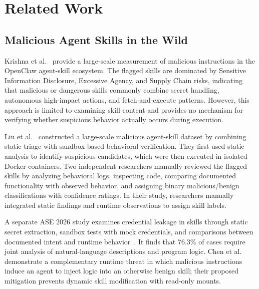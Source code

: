 \section{Related Work}
\label{sec:related-work}



\subsection{Malicious Agent Skills in the Wild}
Krishna et al.~\cite{krishna2026clawdpwned} provide a large-scale measurement of malicious instructions in the OpenClaw agent-skill ecosystem. The flagged skills are dominated by Sensitive Information Disclosure, Excessive Agency, and Supply Chain risks, indicating that malicious or dangerous skills commonly combine secret handling, autonomous high-impact actions, and fetch-and-execute patterns. However, this approach is limited to examining skill content and provides no mechanism for verifying whether suspicious behavior actually occurs during execution.

Liu et al.~\cite{liuMaliciousSkillsWild2026} constructed a large-scale malicious agent-skill dataset by combining static triage with sandbox-based behavioral verification. They first used static analysis to identify suspicious candidates, which were then executed in isolated Docker containers. Two independent researchers manually reviewed the flagged skills by analyzing behavioral logs, inspecting code, comparing documented functionality with observed behavior, and assigning binary malicious/benign classifications with confidence ratings. In their study, researchers manually integrated static findings and runtime observations to assign skill labels.

A separate ASE 2026 study examines credential leakage in skills through static secret extraction, sandbox tests with mock credentials, and comparisons between documented intent and runtime behavior~\cite{chen2026credentialleaks}. It finds that 76.3\% of cases require joint analysis of natural-language descriptions and program logic. Chen et al.~\cite{chen2026dymalskill} demonstrate a complementary runtime threat in which malicious instructions induce an agent to inject logic into an otherwise benign skill; their proposed mitigation prevents dynamic skill modification with read-only mounts.

